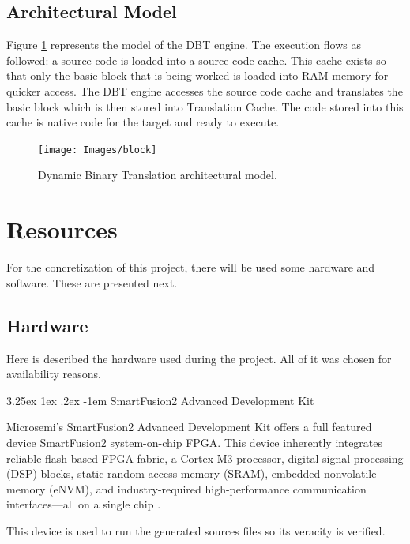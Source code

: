 \documentclass{report}
\makeatletter
\renewcommand\paragraph{\@startsection{paragraph}{5}{\z@}%
	{3.25ex \@plus1ex \@minus.2ex}%
	{-1em}%
	{\normalfont\normalsize\bfseries}}
\makeatother
\begin{document}
			
	\subsection{Architectural Model}
	\par Figure \ref{fig:block} represents the model of the DBT engine. The execution flows as followed: a source code is loaded into a source code cache. This cache exists so that only the basic block that is being worked is loaded into RAM memory for quicker access. The DBT engine accesses the source code cache and translates the basic block which is then stored into Translation Cache. The code stored into this cache is native code for the target and ready to execute\cite{f.salgadoj.mendesa.tavaresm.ekpanyapong}.
		
	\begin{figure} [H]
		\centering
		\texttt{[image: Images/block]}
		\caption{Dynamic Binary Translation architectural model.}
		\label{fig:block}
	\end{figure}


	\section{Resources}
	
		\par For the concretization of this project, there will be used some hardware and software. These are presented next.

		\subsection{Hardware}
		
			\par Here is described the hardware used during the project. All of it was chosen for availability reasons. 

			\paragraph{SmartFusion2 Advanced Development Kit}
			
			\par Microsemi's SmartFusion2 Advanced Development Kit offers a full featured device SmartFusion2 system-on-chip FPGA. This device inherently integrates reliable flash-based FPGA fabric, a Cortex-M3 processor, digital signal processing (DSP) blocks, static random-access memory (SRAM), embedded nonvolatile memory (eNVM), and industry-required high-performance communication interfaces—all on a single chip \cite{microsemi}. 
			\par This device is used to run the generated sources files so its veracity is verified. 
			
\end{document}
